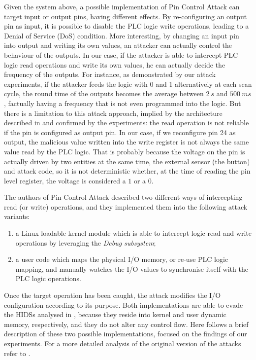Given the system above, a possible implementation of Pin Control Attack can target input or output pins, having different effects.
By re-configuring an output pin as input, it is possible to disable the PLC logic write operations, leading to a Denial of Service (DoS) condition.
More interesting, by changing an input pin into output and writing its own values, an attacker can actually control the behaviour of the outputs.
In our case, if the attacker is able to intercept PLC logic read operations and write its own values, he can actually decide the frequency of the outputs.
For instance, as demonstrated by our attack experiments, if the attacker feeds the logic with $0$ and $1$ alternatively at each scan cycle,
the round time of the outputs becomes the average between $\SI{2}{s}$ and $\SI{500}{ms}$, factually having a frequency that is not even programmed into the logic.
But there is a limitation to this attack approach, implied by the architecture described in  and confirmed by the experiments:
the read operation is not reliable if the pin is configured as output pin. In our case, if we reconfigure pin 24 as output, the malicious value written into the write register
is not always the same value read by the PLC logic. That is probably because the voltage on the pin is actually driven by two entities at the same time,
the external sensor (the button) and attack code, so it is not deterministic whether, at the time of reading the pin level register, the voltage is considered a $1$ or a $0$.

The authors of Pin Control Attack described two different ways of intercepting read (or write) operations, and they implemented them into the following attack variants:
\begin{enumerate}
	\item a Linux loadable kernel module which is able to intercept logic read and write operations by leveraging the \emph{Debug subsystem};
	\item a user code which maps the physical I/O memory, or re-use PLC logic mapping, and manually watches the I/O values to synchronise itself with the PLC logic operations.
\end{enumerate}
Once the target operation has been caught, the attack modifies the I/O configuration according to its purpose.
Both implementations are able to evade the HIDSs analysed in , because they reside into kernel and user dynamic memory, respectively,
and they do not alter any control flow. Here follows a brief description of these two possible implementations, focused on the findings of our experiments.
For a more detailed analysis of the original version of the attacks refer to \cite{ghostplc}.


